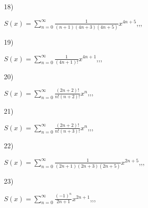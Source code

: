 \documentclass[11pt, ukrainian]{article}
\begin{document}
\par
\vspace{0.9cm}
18) \space 
{%
{$S(x)=\sum\limits_{n=0}^{\infty}{\frac{1}{(n+1)(4n+3)(4n+5)}}{x^{{4n+5}}}$},,, \par \smallskip  
}
\par
\vspace{0.9cm}
19) \space 
{%
{$S(x)=\sum\limits_{n=0}^{\infty}{\frac{1}{(4n+1)!}}{x^{{4n+1}}}$},,, \par \smallskip  
}
\par
\vspace{0.9cm}
20) \space 
{%
{$S(x)=\sum\limits_{n=0}^{\infty}{\frac{(2n+2)!}{n!(n+2)!}}{x^{n}}$},,, \par \smallskip  
}
\par
\newpage
21) \space 
{%
{$S(x)=\sum\limits_{n=0}^{\infty}{\frac{(2n+2)!}{n!(n+3)!}}{x^{n}}$},,, \par \smallskip  
}
\par
\vspace{0.9cm}
22) \space 
{%
{$S(x)=\sum\limits_{n=0}^{\infty}{\frac{1}{(2n+1)(2n+3)(2n+5)}}{x^{{2n+5}}}$},,, \par \smallskip  
}
\par
\vspace{0.9cm}
23) \space 
{%
{$S(x)=\sum\limits_{n=0}^{\infty}{\frac{(-1)^{n}}{2n+1}}{x^{{2n+1}}}$},,, \par \smallskip  
}
\end{document}
